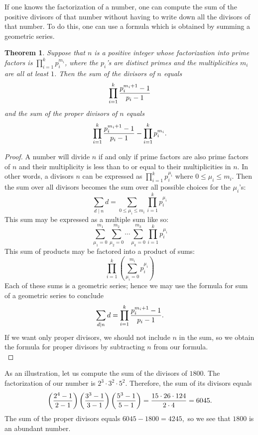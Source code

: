 \documentclass[12pt]{article}
\newtheorem{thm}{Theorem}
\begin{document}
  
If one knows the factorization of a number,
one can compute the sum of the positive divisors of
that number without having to write down
all the divisors of that number.  To do 
this, one can use a formula which is obtained
by summing a geometric series.\\

\begin{thm}
Suppose that $n$ is a positive integer whose factorization
into prime factors is $\prod_{i=1}^k p_i^{m_i}$,
where the $p_i$'s are distinct primes and the
multiplicities $m_i$ are all at least $1$.  Then
the sum of the divisors of $n$ equals
\[
\prod_{i=1}^k
{p_i^{m_i + 1} - 1 \over p_i - 1}
\]
and the sum of the proper divisors of $n$ equals
\[
\prod_{i=1}^k
{p_i^{m_i + 1} - 1 \over p_i - 1} -
\prod_{i=1}^k p_i^{m_i}.
\]
\end{thm}

\begin{proof}
A number will divide $n$ if and only if prime
factors are also prime factors of $n$ and
their multiplicity is less than to or equal
to their multiplicities in $n$.  In other
words, a divisors $n$ can be expressed
as $\prod_{i=1}^k p_i^{\mu_i}$ where $0 \le
\mu_i \le m_i$.  Then the sum over all divisors
becomes the sum over all possible choices
for the $\mu_i$'s:
\[
\sum_{d \mid n} d =
\sum_{0 \le \mu_i \le m_i}
\prod_{i=1}^k p_i^{\mu_i}
\]
This sum may be expressed as a multiple 
sum like so:
\[
\sum_{\mu_1 = 0}^{m_1} 
\sum_{\mu_2 = 0}^{m_2} \cdots
\sum_{\mu_k = 0}^{m_k}
\prod_{i=1}^k p_i^{\mu_i}
\]
This sum of products may be factored into
a product of sums:
\[
\prod_{i=1}^k
\left( 
\sum_{\mu_i = 0}^{m_i}
p_i^{\mu_i}
\right)
\]
Each of these sums is a geometric series;
hence we may use the formula for sum of a
geometric series to conclude
\[
\sum_{d \mid n} d =
\prod_{i=1}^k
{p_i^{m_i + 1} - 1 \over p_i - 1}.
\]
If we want only proper divisors, we should
not include $n$ in the sum, so we obtain
the formula for proper divisors by subtracting
$n$ from our formula.\\
\end{proof}

As an illustration, let us compute the sum
of the divisors of $1800$.  The factorization
of our number is $2^3 \cdot 3^2 \cdot 5^2$.
Therefore, the sum of its divisors equals
\[
\left( {2^4 - 1} \over {2 - 1} \right)
\left( {3^3 - 1} \over {3 - 1} \right)
\left( {5^3 - 1} \over {5 - 1} \right) =
{15 \cdot 26 \cdot 124 \over 2 \cdot 4} =
6045.
\]
The sum of the proper divisors equals
$6045 - 1800 = 4245$,\, so we see that
$1800$ is an abundant number.
\end{document}
